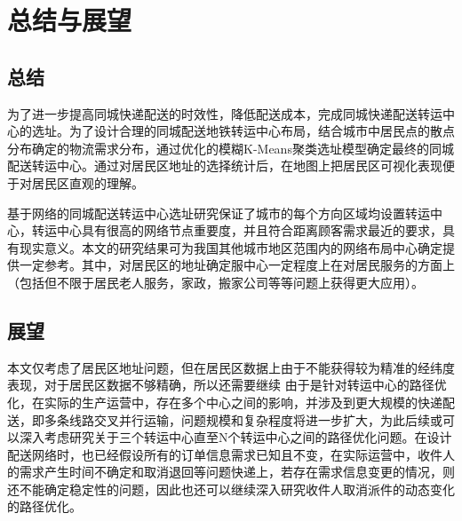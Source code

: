 \clearpage
\section{总结与展望}
\subsection{总结}
\par 为了进一步提高同城快递配送的时效性，降低配送成本，完成同城快递配送转运中心的选址。为了设计合理的同城配送地铁转运中心布局，结合城市中居民点的散点分布确定的物流需求分布，通过优化的模糊\rm{K-Means}聚类选址模型确定最终的同城配送转运中心。通过对居民区地址的选择统计后，在地图上把居民区可视化表现便于对居民区直观的理解。
\par 基于网络的同城配送转运中心选址研究保证了城市的每个方向区域均设置转运中心，转运中心具有很高的网络节点重要度，并且符合距离顾客需求最近的要求，具有现实意义。本文的研究结果可为我国其他城市地区范围内的网络布局中心确定提供一定参考。其中，对居民区的地址确定服中心一定程度上在对居民服务的方面上（包括但不限于居民老人服务，家政，搬家公司等等问题上获得更大应用）。

\subsection{展望}
\par 本文仅考虑了居民区地址问题，但在居民区数据上由于不能获得较为精准的经纬度表现，对于居民区数据不够精确，所以还需要继续
由于是针对转运中心的路径优化，在实际的生产运营中，存在多个中心之间的影响，并涉及到更大规模的快递配送，即多条线路交叉并行运输，问题规模和复杂程度将进一步扩大，为此后续或可以深入考虑研究关于三个转运中心直至N个转运中心之间的路径优化问题。在设计配送网络时，也已经假设所有的订单信息需求已知且不变，在实际运营中，收件人的需求产生时间不确定和取消退回等问题快递上，若存在需求信息变更的情况，则还不能确定稳定性的问题，因此也还可以继续深入研究收件人取消派件的动态变化的路径优化。 


% 

% 

% 
